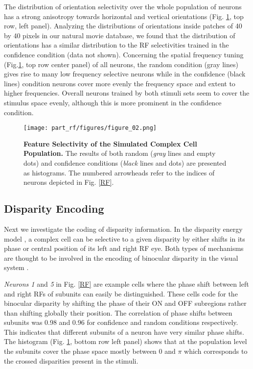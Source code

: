 {The distribution of orientation selectivity over the whole population of
neurons has a strong anisotropy towards horizontal and vertical
orientations (Fig. \ref{hist}, top row, left panel). Analyzing the
distributions of orientations inside patches of 40 by 40 pixels in our
natural movie database, we found that the distribution of orientations has
a similar distribution to the RF selectivities trained in the confidence
condition (data not shown). Concerning the spatial frequency tuning
(Fig.\ref{hist}, top row center panel) of all neurons, the random condition
(gray lines) gives rise to many low frequency selective neurons while in
the confidence (black lines) condition neurons cover more evenly the
frequency space and extent to higher frequencies. Overall neurons trained
by both stimuli sets seem to cover the stimulus space evenly, although this
is more prominent in the confidence condition. 


\begin{figure}[!htb] 
\centerline{
\texttt{[image: part\_rf/figures/figure\_02.png]}}
\caption[Feature Selectivity of the Simulated Complex Cell
Population.]{\textbf{Feature Selectivity of the Simulated Complex Cell
Population.} The results of both random (\textit{gray} lines and empty
dots) and confidence conditions (\textit{black} lines and dots) are
presented as histograms. The numbered arrowheads refer to the indices of
neurons depicted in Fig. \ref{RF}.} \label{hist} \end{figure} 


\subsection{{Disparity Encoding}}
 
Next we investigate the coding of disparity information. In the disparity
energy model \citep{ohzawa1990a}, a complex cell can be selective to a
given disparity by either shifts in its phase or central position of its
left and right RF eye. Both types of mechanisms are thought to be involved
in the encoding of binocular disparity in the visual system
\citep{anzai1997a,deangelis2000a}. 
 
\textit{Neurons 1} and \textit{5} in Fig. \ref{RF} are example cells where
the phase shift between left and right RFs of subunits can easily be
distinguished. These cells code for the binocular disparity by shifting the
phase of their ON and OFF subregions rather than shifting globally their
position. The correlation of phase shifts between subunits was 0.98 and
0.96 for confidence and random conditions respectively. This indicates that
different subunits of a neuron have very similar phase shifts. The
histogram (Fig. \ref{hist}, bottom row left panel) shows that at the
population level the subunits cover the phase space mostly between 0 and
$\pi$ which corresponds to the crossed disparities present in the stimuli.

}
